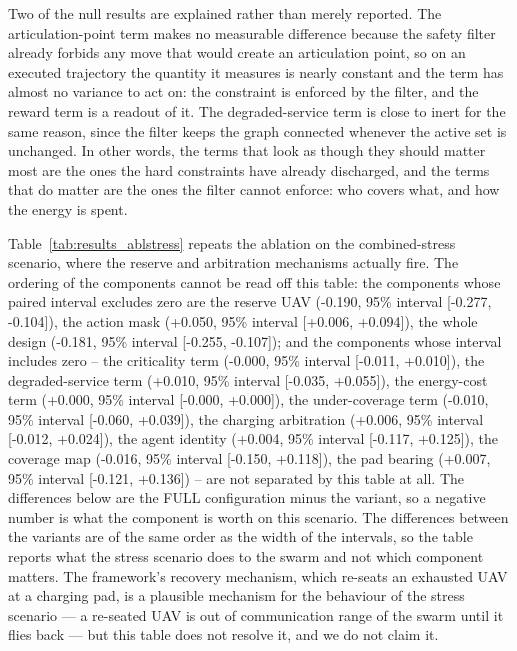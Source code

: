 Two of the null results are explained rather than merely reported.  The
articulation-point term makes no measurable difference because the safety
filter already forbids any move that would create an articulation point, so
on an executed trajectory the quantity it measures is nearly constant and
the term has almost no variance to act on: the constraint is enforced by the
filter, and the reward term is a readout of it.  The degraded-service term
is close to inert for the same reason, since the filter keeps the graph
connected whenever the active set is unchanged.  In other words, the terms
that look as though they should matter most are the ones the hard
constraints have already discharged, and the terms that do matter are the
ones the filter cannot enforce: who covers what, and how the energy is
spent.


Table~\ref{tab:results_ablstress} repeats the ablation on the combined-stress scenario, where the reserve and arbitration mechanisms actually fire. The ordering of the components cannot be read off this table: the components whose paired interval excludes zero are the reserve UAV (-0.190, 95\% interval [-0.277, -0.104]), the action mask (+0.050, 95\% interval [+0.006, +0.094]), the whole design (-0.181, 95\% interval [-0.255, -0.107]); and the components whose interval includes zero -- the criticality term (-0.000, 95\% interval [-0.011, +0.010]), the degraded-service term (+0.010, 95\% interval [-0.035, +0.055]), the energy-cost term (+0.000, 95\% interval [-0.000, +0.000]), the under-coverage term (-0.010, 95\% interval [-0.060, +0.039]), the charging arbitration (+0.006, 95\% interval [-0.012, +0.024]), the agent identity (+0.004, 95\% interval [-0.117, +0.125]), the coverage map (-0.016, 95\% interval [-0.150, +0.118]), the pad bearing (+0.007, 95\% interval [-0.121, +0.136]) -- are not separated by this table at all.  The differences below are the FULL configuration minus the variant, so a negative number is what the component is worth on this scenario.  The differences between the variants are of the same order as the width of the intervals, so the table reports what the stress scenario does to the swarm and not which component matters.  The framework's recovery mechanism, which re-seats an exhausted UAV at a charging pad, is a plausible mechanism for the behaviour of the stress scenario --- a re-seated UAV is out of communication range of the swarm until it flies back --- but this table does not resolve it, and we do not claim it.

